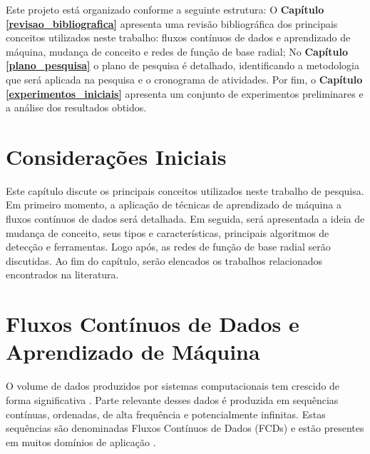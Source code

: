 \documentclass[qual, classic, a4paper]{ufbathesis}
\begin{document}
Este projeto está organizado conforme a seguinte estrutura: 
O \textbf{Capítulo \ref{revisao_bibliografica}} apresenta uma revisão bibliográfica dos principais conceitos utilizados neste trabalho: fluxos contínuos de dados e aprendizado de máquina, mudança de conceito e redes de função de base radial; 
No \textbf{Capítulo \ref{plano_pesquisa}} o plano de pesquisa é detalhado, 
identificando a metodologia que será aplicada na pesquisa e o cronograma de atividades. 
Por fim, o \textbf{Capítulo \ref{experimentos_iniciais}} 
apresenta um conjunto de experimentos preliminares e a análise dos resultados obtidos.

 \label{revisao_bibliografica}
\section{Considerações Iniciais}

Este capítulo discute os principais conceitos utilizados neste trabalho de pesquisa.
Em primeiro momento, a aplicação de técnicas de aprendizado de máquina a fluxos contínuos de dados será detalhada.
Em seguida, será apresentada a ideia de mudança de conceito, seus tipos e características, principais algoritmos de detecção e ferramentas.
Logo após, as redes de função de base radial serão discutidas.
Ao fim do capítulo, serão elencados os trabalhos relacionados encontrados na literatura.

\section{Fluxos Contínuos de Dados e Aprendizado de Máquina}

O volume de dados produzidos por sistemas computacionais tem crescido de forma significativa \cite{Cohen:BigData:2009:MSN:1687553.1687576}.
Parte relevante desses dados é produzida em sequências contínuas, ordenadas, de alta frequência e potencialmente infinitas.
Estas sequências são denominadas Fluxos Contínuos de Dados (FCDs) e estão presentes em muitos domínios de aplicação \cite{Aggarwal:2006:DSM:1196418}.


\end{document}
